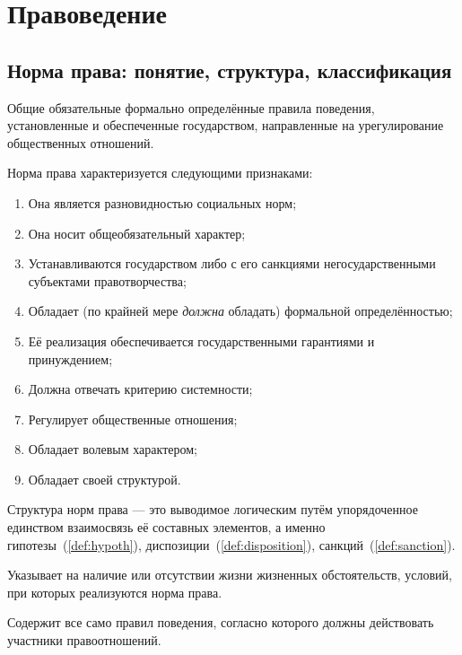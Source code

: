 \part{Правоведение}

\chapter{Норма права: понятие, структура, классификация}

\begin{definition}
  Общие обязательные формально определённые правила поведения,
  установленные и обеспеченные государством, направленные на
  урегулирование общественных отношений.
\end{definition}

Норма права характеризуется следующими признаками:

\begin{enumerate}
  \item Она является разновидностью социальных норм;
  \item Она носит общеобязательный характер;
  \item Устанавливаются государством либо с его санкциями
    негосударственными субъектами правотворчества;
  \item Обладает (по крайней мере \emph{должна} обладать) формальной
    определённостью;
  \item Её реализация обеспечивается государственными гарантиями и принуждением;
  \item Должна отвечать критерию системности;
  \item Регулирует общественные отношения;
  \item Обладает волевым характером;
  \item Обладает своей структурой.
\end{enumerate}

Структура норм права --- это выводимое логическим путём упорядоченное единством
взаимосвязь её составных элементов, а именно
гипотезы~(\ref{def:hypoth}), диспозиции~(\ref{def:disposition}),
санкций~(\ref{def:sanction}).

\begin{definition}[Гипотеза]\label{def:hypoth}
  Указывает на наличие или отсутствии жизни жизненных обстоятельств,
  условий, при которых реализуются норма права.
\end{definition}

\begin{definition}[Диспозиция]\label{def:disposition}
  Содержит все само правил поведения, согласно которого должны
  действовать участники правоотношений.
\end{definition}

